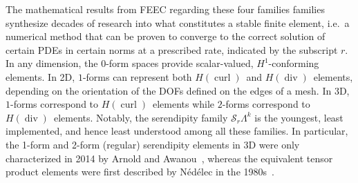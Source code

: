 \documentclass[format=acmsmall,screen,timestamp=false,a4paper]{acmart}
\DeclareMathOperator{\Div}{div}
\DeclareMathOperator{\curl}{curl}
\newcommand{\calS}{\mathcal{S}}
\newcommand{\hcurl}{\ensuremath{{H}(\curl)}\xspace}
\newcommand{\hdiv}{\ensuremath{{H}(\Div)}\xspace}
\begin{document}
    The mathematical results from FEEC regarding these four families families synthesize decades of research into what constitutes a stable finite element, i.e.\ a numerical method that can be proven to converge to the correct solution of certain PDEs in certain norms at a prescribed rate, indicated by the subscript $r$.  In any dimension, the $0$-form spaces provide scalar-valued, $H^1$-conforming elements.  In 2D, $1$-forms can represent both \hcurl~and \hdiv~elements, depending on the orientation of the DOFs defined on the edges of a mesh.  In 3D, $1$-forms correspond to \hcurl~elements while $2$-forms correspond to \hdiv~elements.  Notably, the serendipity family $\calS_r\Lambda^k$ is the youngest, least implemented, and hence least understood among all these families.  In particular, the 1-form and 2-form (regular) serendipity elements in 3D were only characterized in 2014 by Arnold and Awanou~\cite{arnold2014finite}, whereas the equivalent tensor product elements were first described by N\'ed\'elec in the 1980s~\cite{N1980,N1986}.
 
 
 
 
 
\end{document}
